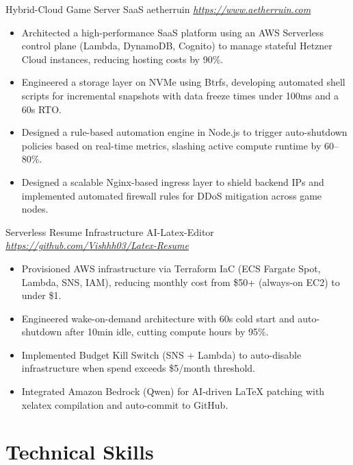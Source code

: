 \documentclass[10pt, a4paper, sans]{moderncv}
\begin{document}
\cventry
  {}
  {Hybrid-Cloud Game Server SaaS}
  {aetherruin}
  {\textit{\url{https://www.aetherruin.com}}}
  {}
  {
  \begin{itemize}\setlength{\itemsep}{2pt}
    \item Architected a high-performance SaaS platform using an AWS Serverless control plane (Lambda, DynamoDB, Cognito) to manage stateful Hetzner Cloud instances, reducing hosting costs by 90\%.
    \item Engineered a storage layer on NVMe using Btrfs, developing automated shell scripts for incremental snapshots with data freeze times under 100ms and a 60s RTO.
    \item Designed a rule-based automation engine in Node.js to trigger auto-shutdown policies based on real-time metrics, slashing active compute runtime by 60--80\%.
    \item Designed a scalable Nginx-based ingress layer to shield backend IPs and implemented automated firewall rules for DDoS mitigation across game nodes.
  \end{itemize}
  }

\vspace{1mm}

\cventry
  {}
  {Serverless Resume Infrastructure}
  {AI-Latex-Editor}
  {\textit{\url{https://github.com/Vishhh03/Latex-Resume}}}
  {}
  {
  \begin{itemize}\setlength{\itemsep}{2pt}
    \item Provisioned AWS infrastructure via Terraform IaC (ECS Fargate Spot, Lambda, SNS, IAM), reducing monthly cost from \$50+ (always-on EC2) to under \$1.
    \item Engineered wake-on-demand architecture with 60s cold start and auto-shutdown after 10min idle, cutting compute hours by 95\%.
    \item Implemented Budget Kill Switch (SNS + Lambda) to auto-disable infrastructure when spend exceeds \$5/month threshold.
    \item Integrated Amazon Bedrock (Qwen) for AI-driven LaTeX patching with xelatex compilation and auto-commit to GitHub.
  \end{itemize}
  }

\section{Technical Skills}

\end{document}
